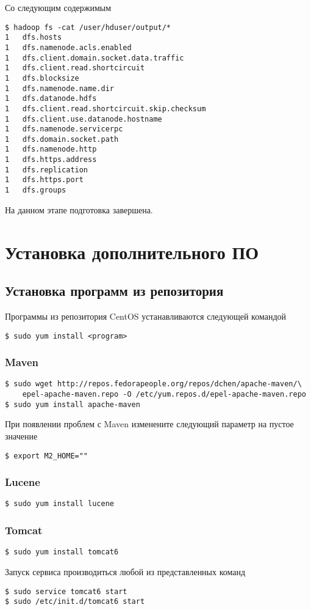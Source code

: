 Со следующим содержимым
\begin{lstlisting}
$ hadoop fs -cat /user/hduser/output/*
1   dfs.hosts
1   dfs.namenode.acls.enabled
1   dfs.client.domain.socket.data.traffic
1   dfs.client.read.shortcircuit
1   dfs.blocksize
1   dfs.namenode.name.dir
1   dfs.datanode.hdfs
1   dfs.client.read.shortcircuit.skip.checksum
1   dfs.client.use.datanode.hostname
1   dfs.namenode.servicerpc
1   dfs.domain.socket.path
1   dfs.namenode.http
1   dfs.https.address
1   dfs.replication
1   dfs.https.port
1   dfs.groups
\end{lstlisting}
На данном этапе подготовка завершена.

\chapter{Установка дополнительного ПО}
\section{Установка программ из репозитория}
Программы из репозитория CentOS устанавливаются следующей командой
\begin{lstlisting}
$ sudo yum install <program>
\end{lstlisting}

\subsection{Maven}
\begin{lstlisting}
$ sudo wget http://repos.fedorapeople.org/repos/dchen/apache-maven/\
    epel-apache-maven.repo -O /etc/yum.repos.d/epel-apache-maven.repo
$ sudo yum install apache-maven
\end{lstlisting}
При появлении проблем с Maven изменените следующий параметр на пустое значение
\begin{lstlisting}
$ export M2_HOME=""
\end{lstlisting} 

\subsection{Lucene}
\begin{lstlisting}
$ sudo yum install lucene
\end{lstlisting}

\subsection{Tomcat}
\begin{lstlisting}
$ sudo yum install tomcat6
\end{lstlisting}
Запуск сервиса производиться любой из представленных команд
\begin{lstlisting}
$ sudo service tomcat6 start
$ sudo /etc/init.d/tomcat6 start
\end{lstlisting}

